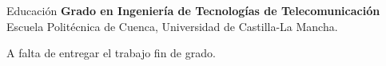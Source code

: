\begin{rubric}{Educación}
\entry*[2019 -- 2023]%
	\textbf{Grado en Ingeniería de Tecnologías de Telecomunicación} Escuela Politécnica de Cuenca, Universidad de Castilla-La Mancha.
	\par A falta de entregar el trabajo fin de grado.
%
\end{rubric}